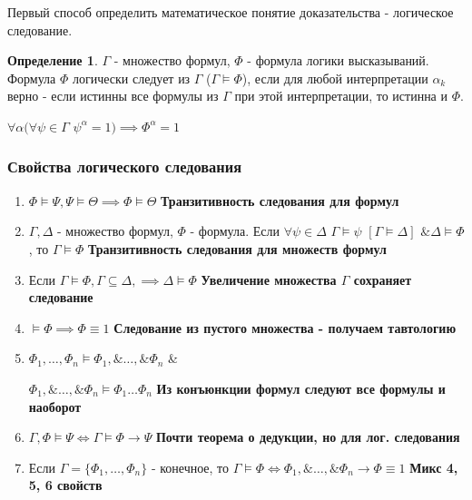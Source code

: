 \documentclass[a4paper]{article}
\theoremstyle{definition}
\newtheorem*{definition}{Определение}
\theoremstyle{remark}
\begin{document}
    Первый способ определить математическое понятие доказательства - логическое следование.
    \begin{definition}
        $\Gamma $ - множество формул, $\Phi$  - формула логики высказываний. Формула $ \Phi$  логически следует из $\Gamma$ ($\Gamma \models \Phi $), если для любой интерпретации
        $\alpha_k$ верно - если истинны все формулы из $\Gamma$ при этой интерпретации, то истинна и $\Phi$.

        $\forall \alpha (\forall \psi \in \Gamma$ $\psi^\alpha = 1)\implies \Phi^\alpha = 1$
    \end{definition}
    \subsubsection*{Свойства логического следования}
    \begin{enumerate}
        \item $\Phi \models \Psi, \Psi \models \Theta \implies \Phi \models \Theta$ \textbf{Транзитивность следования для формул}
        \item $\Gamma, \Delta $ - множество формул, $\Phi$ - формула. Если
        $\forall \psi\in\Delta$ $\Gamma\models\psi$ $[\Gamma \models \Delta]$ $\&\Delta\models\Phi$, 
        то $\Gamma\models\Phi$ \textbf{Транзитивность следования для множеств формул}
        \item Если $\Gamma \models \Phi, \Gamma \subseteq \Delta, \implies \Delta \models \Phi$ \textbf{Увеличение множества $\Gamma$ сохраняет следование}
        \item $\models \Phi \implies \Phi \equiv 1$ \textbf{Следование из пустого множества - получаем тавтологию}
        \item $\Phi_1, \dots, \Phi_n\models \Phi_1,\& \dots,\& \Phi_n$ \& 
        
        $\Phi_1,\& \dots,\& \Phi_n\models\Phi_1 \dots \Phi_n$ \textbf{Из конъюнкции формул следуют все формулы и наоборот}
        \item $\Gamma, \Phi\models \Psi\Leftrightarrow \Gamma \models \Phi \to \Psi$ \textbf{Почти теорема о дедукции, но для лог. следования}
        \item Если $\Gamma = \{\Phi_1, \dots, \Phi_n \}$ - конечное, то $\Gamma \models \Phi \Leftrightarrow \Phi_1,\& \dots,\& \Phi_n\to \Phi \equiv 1$
        \textbf{Микс 4, 5, 6 свойств}
    \end{enumerate}
\end{document}
